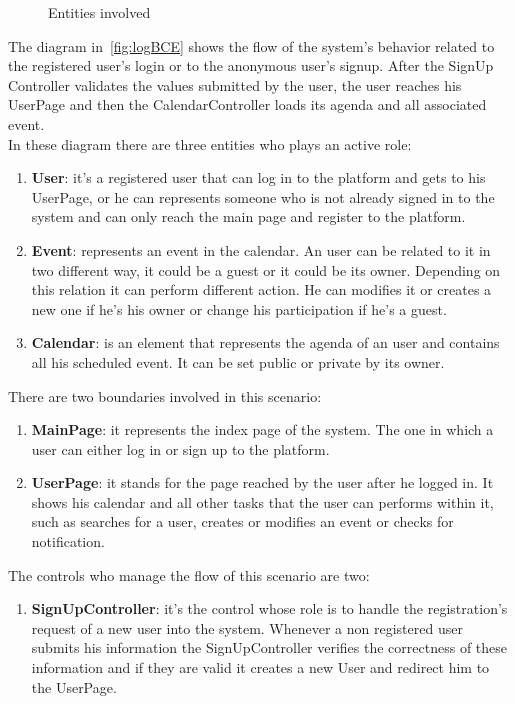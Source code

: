 \begin{itemize}
\begin{center}
\begin{figure}[H]
    \caption{Entities involved}
     \label{fig:entityovervie}
     \end{figure}
   \end{center}  


The diagram in~\ref{fig:logBCE} shows the flow of the system's behavior related to the registered user's login or to the anonymous user's signup. After the SignUp Controller validates the values submitted by the user, the user reaches his UserPage and then the CalendarController loads its agenda and all associated event. \\In these diagram there are three entities who plays an active role:
\begin{enumerate}
\item  {\bf User}: it's a registered user that can log in to the platform and gets to his UserPage, or he can  represents someone who is not already signed in  to the system and can only reach the main page and register to the platform.
\item  {\bf Event}: represents an event in the calendar. An user can be related to it in two different way, it could be a guest or it could be its owner. Depending on this relation it can perform different action. He can modifies it or creates a new one if he's his owner or change his participation if he's a guest.
\item  {\bf Calendar}: is an element that represents the agenda of an user and contains all his scheduled event. It can be set public or private by its owner.
\end{enumerate}
There are two boundaries involved in this scenario: \begin{enumerate}
\item  {\bf MainPage}: it represents the index page of the system. The one in which a user can either log in or sign up to the platform.
\item  {\bf UserPage}: it stands for the page reached by the user after he logged in. It shows his calendar and all other tasks that the user can performs within it, such as searches for a user, creates or modifies an event or checks for notification.
 \end{enumerate}
The controls who manage the flow of this scenario are two:\begin{enumerate}
\item  {\bf SignUpController}: it's the control whose role is to handle the registration's request of a new user into the system. Whenever a non registered user submits his information the SignUpController verifies the correctness of these information and if they are valid it creates a new User and redirect him to the UserPage.

\end{enumerate}
\end{itemize}
